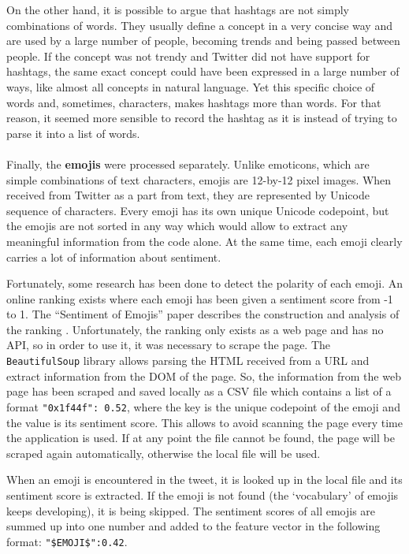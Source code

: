 On the other hand, it is possible to argue that hashtags are not simply combinations of words. They usually define a concept in a very concise way and are used by a large number of people, becoming trends and being passed between people. If the concept was not trendy and Twitter did not have support for hashtags, the same exact concept could have been expressed in a large number of ways, like almost all concepts in natural language. Yet this specific choice of words and, sometimes, characters, makes hashtags more than words. For that reason, it seemed more sensible to record the hashtag as it is instead of trying to parse it into a list of words. 

\paragraph{}
Finally, the \textbf{emojis} were processed separately. Unlike emoticons, which are simple combinations of text characters, emojis are 12-by-12 pixel images. When received from Twitter as a part from text, they are represented by Unicode sequence of characters. Every emoji has its own unique Unicode codepoint, but the emojis are not sorted in any way which would allow to extract any meaningful information from the code alone. At the same time, each emoji clearly carries a lot of information about sentiment. 

Fortunately, some research has been done to detect the polarity of each emoji. An online ranking exists where each emoji has been given a sentiment score from -1 to 1. The ``Sentiment of Emojis'' paper describes the construction and analysis of the ranking \cite{Kralj2015emojis}. Unfortunately, the ranking only exists as a web page and has no API, so in order to use it, it was necessary to scrape the page. The \texttt{BeautifulSoup} library allows parsing the HTML received from a URL and extract information from the DOM of the page. So, the information from the web page has been scraped and saved locally as a CSV file which contains a list of a format \texttt{"0x1f44f": 0.52}, where the key is the unique codepoint of the emoji and the value is its sentiment score. This allows to avoid scanning the page every time the application is used. If at any point the file cannot be found, the page will be scraped again automatically, otherwise the local file will be used. 

When an emoji is encountered in the tweet, it is looked up in the local file and its sentiment score is extracted. If the emoji is not found (the `vocabulary' of emojis keeps developing), it is being skipped. The sentiment scores of all emojis are summed up into one number and added to the feature vector in the following format: \texttt{"\$EMOJI\$":0.42}. 

